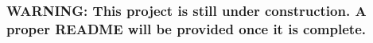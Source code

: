 \subsubsection*{W\+A\+R\+N\+I\+NG\+: This project is still under construction. A proper R\+E\+A\+D\+ME will be provided once it is complete.}